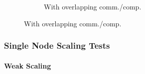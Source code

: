 \begin{frame}
\begin{figure}
\begin{subfigure}{0.47\textwidth}
      \caption{With overlapping comm./comp.}
      \label{FIG:Benchmark:Hybrid_1_Multi_Node}
    \end{subfigure}
    \label{FIG:Benchmark:Hybrid_Multi_Node}
  \end{figure}
\end{frame}


\begin{frame}
  \frametitle{Single Node Scaling Tests}
  \framesubtitle{Weak Scaling}


\end{frame}
